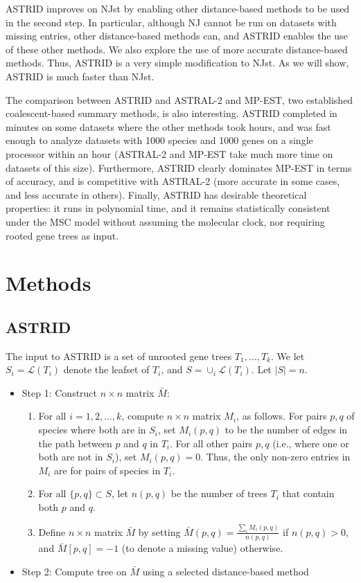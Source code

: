 ASTRID improves on NJst  by
enabling other distance-based methods to be used in the second
step. In particular, although NJ cannot be run on datasets with missing
entries, other distance-based methods can, and ASTRID enables the use
of these other methods. We also explore the use of more accurate
distance-based methods. Thus, ASTRID is a very simple modification to NJst.
As we will show, ASTRID is much faster than NJst.

The comparison between ASTRID and ASTRAL-2 and MP-EST, two
established coalescent-based summary methods, is also interesting.
ASTRID
completed in minutes on some datasets where the other methods took hours, and
was fast enough to analyze datasets with 1000 species and 1000 genes on
a single processor within an hour (ASTRAL-2 and MP-EST take much more
time on datasets of this size).
Furthermore, 
ASTRID clearly dominates MP-EST in
terms of accuracy, and is competitive with ASTRAL-2 
(more accurate in some cases, and less accurate in others). 
Finally, ASTRID has desirable theoretical properties: 
it runs in polynomial time, and it remains 
statistically consistent under
the MSC model without assuming the molecular clock, nor requiring rooted gene
trees as input.



\section{Methods}

\subsection{ASTRID}


The input to ASTRID is
a set of unrooted gene trees $T_1, \ldots, T_k$. We let 
$S_i=\mathcal{L}(T_i)$ denote the leafset of $T_i$, and
$S = \cup_i \mathcal{L}(T_i)$. Let $|S|=n$.

\begin{itemize}
\item[]{Step 1: Construct $n \times n$  matrix $\bar M$:}
\begin{enumerate}
\item For all $i=1,2,\ldots, k$, compute
$n \times n$ matrix $M_i$,
as follows. For pairs $p,q$  of species where both are
in  $S_i$, set $M_i(p,q)$ to be the
number of edges in
the path between $p$ and $q$ in $T_i$. 
For all other pairs $p,q$ (i.e., where
one or both are not in $S_i$), set $M_i(p,q) = 0$.
Thus, the only non-zero entries in $M_i$ are for pairs of
species in $T_i$.
\item For all $\{p,q\} \subset S$, let $n(p,q)$ be the
number of trees $T_i$ that contain both $p$ and $q$. 
\item Define $n \times n$ matrix  $\bar M$ by
setting $\bar M(p, q) =
\frac{\sum_i M_i(p,q)}{n(p,q)}$ if $n(p,q) >0$, and
  $\bar M[p,q] = -1$ (to denote a missing value) otherwise.
\end{enumerate}
\item[]{Step 2: Compute tree on $\bar M$ using a selected distance-based method}
\end{itemize}


